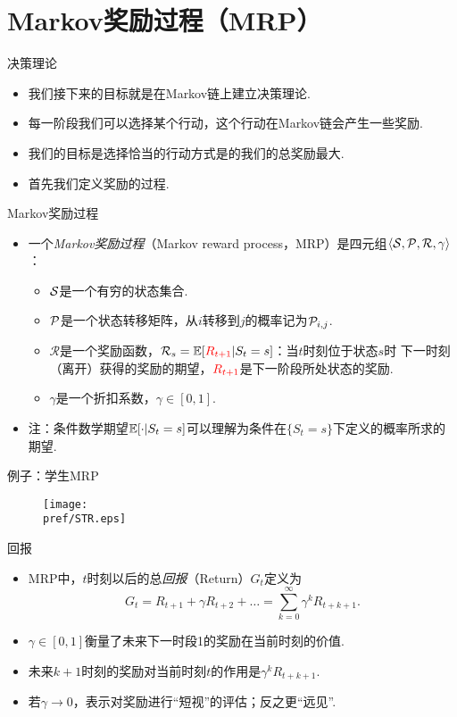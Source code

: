 \section{Markov奖励过程（MRP）}
{决策理论}
\begin{itemize}
    \item 我们接下来的目标就是在Markov链上建立决策理论.
    \item 每一阶段我们可以选择某个行动，这个行动在Markov链会产生一些奖励.
    \item 我们的目标是选择恰当的行动方式是的我们的总奖励最大.
    \item 首先我们定义奖励的过程.
\end{itemize}

{Markov奖励过程}
\begin{itemize}
\item 一个\emph{Markov奖励过程}（Markov reward process，MRP）是四元组$\langle\MS,\P,\mathcal R,\gamma\rangle$：
\begin{itemize}
    \item $\MS$是一个有穷的状态集合.
    \item $\P$是一个状态转移矩阵，从$i$转移到$j$的概率记为$\P_{i,j}$.
    \item $\mathcal R$是一个奖励函数，$\mathcal R_s = \E[\textcolor{red}{R_{t+1}}|S_t=s]$：当$t$时刻位于状态$s$时 下一时刻（离开）获得的奖励的期望，$\textcolor{red}{R_{t+1}}$是下一阶段所处状态的奖励.
    \item $\gamma$是一个折扣系数，$\gamma\in[0,1]$.
\end{itemize}
    \item 注：条件数学期望$\E[\cdot|S_t=s]$可以理解为条件在$\{S_t=s\}$下定义的概率所求的期望.
\end{itemize}


{例子：学生MRP}
\begin{figure}
    \centering
    \texttt{[image: \\pref/STR.eps]}
\end{figure}


{回报}
\begin{itemize}
    \item MRP中，$t$时刻以后的总\emph{回报}（Return）$G_t$定义为
    \[G_t = R_{t+1}+\gamma R_{t+2} +\dots =\sum_{k=0}^\infty \gamma^kR_{t+k+1}.\]
        \item $\gamma \in[0,1]$衡量了未来下一时段1的奖励在当前时刻的价值.
        \item 未来$k+1$时刻的奖励对当前时刻$t$的作用是$\gamma^k R_{t+k+1}$.
        \item 若$\gamma\to0$，表示对奖励进行“短视”的评估；反之更“远见”.
\end{itemize}


